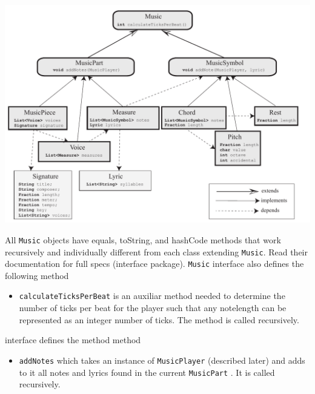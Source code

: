 \documentclass[12pt]{book}
\begin{document}
\medskip

\newpage



\centerline{ \includegraphics{Music_revised.pdf}}

\noindent\makebox[\linewidth]{\rule{\textwidth}{0.4pt}}

All {\tt Music} objects have equals, toString, and hashCode methods  that work recursively and individually different from each class extending {\tt Music}. Read their documentation for full specs (interface package).
{\tt Music} interface also defines the following method

\begin{itemize} 

\item { \tt calculateTicksPerBeat} is an auxiliar method needed to determine the number of ticks per beat for the player such that any notelength can be represented as an integer number of ticks. The method is called recursively.
\end{itemize}


\noindent\makebox[\linewidth]{\rule{\textwidth}{0.4pt}}

\smallskip
{} interface  defines the method method
\begin{itemize} 
\item { \tt addNotes} which takes an instance of  {\tt MusicPlayer} (described later) and adds to it all notes and lyrics found in the current {\tt MusicPart}  . It is called recursively.
\end{itemize}
\end{document}
